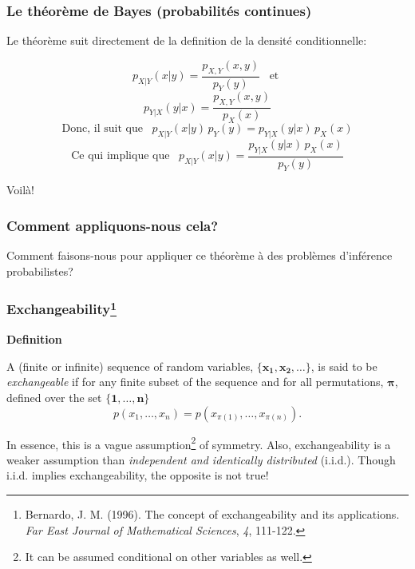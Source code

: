 \documentclass{beamer}
\begin{document}
\begin{frame}
    \frametitle{Le théorème de Bayes (probabilités continues)}
    Le théorème suit directement de la definition de la densité conditionnelle:

    \[p_{X|Y}(x|y) = \frac{p_{X,Y}(x,y)}{p_Y(y)} \,\,\, \textrm{ et }\]
    \[p_{Y|X}(y|x) = \frac{p_{X,Y}(x,y)}{p_X(x)}\]
    \[\textrm{Donc, il suit que } \,\,\, p_{X|Y}(x|y) \, p_Y(y) = p_{Y|X}(y|x) \, p_X(x)\]
    \[\textrm{Ce qui implique que } \,\,\, p_{X|Y}(x|y) = \frac{p_{Y|X}(y|x) \, p_X(x)}{p_Y(y)}\]

    Voilà!
\end{frame}


\begin{frame}
    \frametitle{Comment appliquons-nous cela?}
    Comment faisons-nous pour appliquer ce théorème à des problèmes 
    d'inférence probabilistes?

    \vfill

\end{frame}




\begin{frame}
    \frametitle{Exchangeability\footnote{
        Bernardo, J. M. (1996).
        The concept of exchangeability and its applications.
        \emph{Far East Journal of Mathematical Sciences}, \emph{4}, 111-122.
    }}
    \textbf{Definition}

    \vfill

    A (finite or infinite) sequence of random variables, $\boldsymbol{\{x_1, x_2, \ldots\}}$,
    is said to be \emph{exchangeable} if for any finite subset of the sequence
    and for all permutations, $\boldsymbol{\pi}$, defined over the set $\boldsymbol{\{1, \ldots, n\}}$
    \[p(x_1, \ldots, x_n) = p(x_{\pi(1)}, \ldots, x_{\pi(n)}).\]

    \vfill

    In essence, this is a vague assumption\footnote{
    It can be assumed conditional on other variables as well.} of symmetry.
    Also, exchangeability is a weaker assumption than \emph{independent and identically distributed} (i.i.d.).
    Though i.i.d. implies exchangeability, the opposite is not true!
\end{frame}
\end{document}
